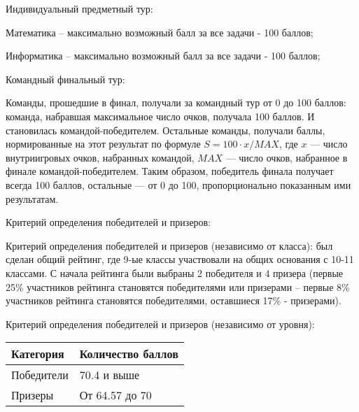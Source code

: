Индивидуальный предметный тур:

Математика – максимально возможный балл за все задачи - 100 баллов; 

Информатика – максимально возможный балл за все задачи - 100 баллов; 

Командный финальный тур:

Команды, прошедшие в финал, получали за командный тур от 0 до 100 баллов: команда, набравшая максимальное число очков, получала 100 баллов. И становилась командой-победителем. Остальные команды, получали баллы, нормированные на этот результат по формуле $S = 100 \cdot x/MAX$, где $x$ — число внутриигровых очков, набранных командой, $MAX$ — число очков, набранное в финале командой-победителем. Таким образом, победитель финала получает всегда 100 баллов, остальные — от 0 до 100, пропорционально показанным ими результатам.


Критерий определения победителей и призеров:

Критерий определения победителей и призеров (независимо от класса): был сделан общий рейтинг, где 9-ые классы участвовали на общих основания с 10-11 классами. С начала рейтинга были выбраны 2 победителя и 4 призера (первые 25\% участников рейтинга становятся победителями или призерами – первые 8\% участников рейтинга становятся победителями, оставшиеся 17\% - призерами).

Критерий определения победителей и призеров (независимо от уровня):
\begin{center}
    \begin{tabular}{|l|l|}
        \hline
        Категория&Количество баллов\\
        \hline
        Победители&70.4 и выше\\
        \hline
        Призеры&От 64.57 до 70\\
        \hline
    \end{tabular}
\end{center}